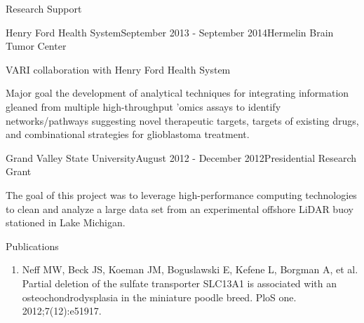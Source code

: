\documentclass{resume} %
\begin{document}

\begin{rSection}{Research Support}
\begin{rSubsection}{Henry Ford Health System}{September 2013 - September 2014}{Hermelin Brain Tumor Center}{}
\item VARI collaboration with Henry Ford Health System
\item Major goal the development of analytical techniques for integrating information gleaned from multiple high-throughput ’omics assays to identify networks/pathways suggesting novel therapeutic targets, targets of existing drugs, and combinational strategies for glioblastoma treatment.
\end{rSubsection}

\begin{rSubsection}{Grand Valley State University}{August 2012 - December 2012}{Presidential Research Grant}{}
\item The goal of this project was to leverage high-performance computing technologies to clean and analyze a large data set from an experimental offshore LiDAR buoy stationed in Lake Michigan.
\end{rSubsection}

\end{rSection}


\begin{rSection}{Publications}
\begin{enumerate}
\item Neff MW, Beck JS, Koeman JM, Boguslawski E, Kefene L, Borgman A, et al. Partial deletion of the sulfate transporter SLC13A1 is associated with an osteochondrodysplasia in the miniature poodle breed. PloS one. 2012;7(12):e51917.
\end{enumerate}
\end{rSection}

\end{document}
